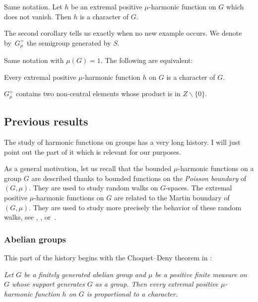 \begin{Cor}
\label{corharmu1}
Same notation.
Let $h$ be an extremal positive $\mu$-harmonic function
on $G$ which does not vanish. Then $h$ is a character of $G$.
\end{Cor}

The second corollary tells us exactly when no new example occurs.
We denote by~$G_\mu^+$ the semigroup generated by $S$.

\begin{Cor}
\label{corharmu2}
Same notation with $\mu(G)=1$.
The following are equivalent:
\begin{enumeratei}
\item\label{corharmu2i}
Every extremal positive $\mu$-harmonic function $h$ on $G$ is
a character of $G$.
\item\label{corharmu2ii}
$G_\mu^+$ contains two non-central elements whose product is in
$Z\smallsetminus \{0\}$.
\end{enumeratei}
\end{Cor}

\subsection{Previous results}
\label{secpreres}
\bq
The study of harmonic functions on groups has a very long history. I will just point out the part of it which is relevant
for our purposes.
\eq

As a general motivation, let us recall that
the bounded $\mu$-harmonic functions on a group $G$
are described thanks
to bounded functions on the \emph{Poisson boundary} of $(G,\mu)$.
They are used to study
random walks on $G$-spaces.
The extremal positive $\mu$\nobreakdash-harmonic functions on $G$
are related to the Martin boundary of $(G,\mu)$.
They are used to study
more precisely the behavior of these random walks,
see \cite{Ancona90}, \cite{Gouezel15}, \cite{Sawyer97} or~\cite{Woess00}.

\subsubsection{Abelian groups}
This part of the history begins with the Choquet--Deny theorem
in \cite{ChoquetDeny60}:

\emph{Let $G$ be a finitely generated abelian group and
$\mu$ be a
positive finite measure on~$G$
whose support generates $G$ as a group.
Then every extremal positive $\mu$-harmonic function
$h$ on $G$ is proportional to a character.}

